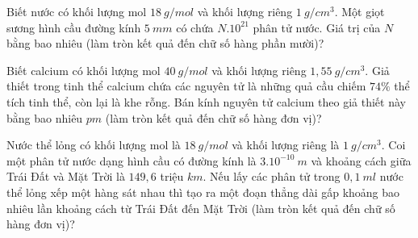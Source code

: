 \begin{ex}%
	Biết nước có khối lượng mol $18\ g/mol$ và khối lượng riêng $1\ g/cm^3$. Một giọt sương hình cầu đường kính $5\ mm$ có chứa $N.10^{21}$ phân tử nước. Giá trị của $N$ bằng bao nhiêu (làm tròn kết quả đến chữ số hàng phần mười)?
\end{ex}

\begin{ex}%
	Biết calcium có khối lượng mol $40\ g/mol$ và khối lượng riêng $1,55\ g/cm^3$. Giả thiết trong tinh thể calcium chứa các nguyên tử là những quả cầu chiếm $74\%$ thể tích tinh thể, còn lại là khe rỗng. Bán kính nguyên tử calcium theo giả thiết này bằng bao nhiêu $pm$ (làm tròn kết quả đến chữ số hàng đơn vị)?
	
\end{ex}

\begin{ex}%
	Nước thể lỏng có khối lượng mol là $18\ g/mol$ và khối lượng riêng là $1\ g/cm^3$. Coi một phân tử nước dạng hình cầu có đường kính là $3.10^{-10}\ m$ và khoảng cách giữa Trái Đất và Mặt Trời là $149,6$ triệu $km$. Nếu lấy các phân tử trong $0,1\ ml$ nước thể lỏng xếp một hàng sát nhau thì tạo ra một đoạn thẳng dài gấp khoảng bao nhiêu lần khoảng cách từ Trái Đất đến Mặt Trời (làm tròn kết quả đến chữ số hàng đơn vị)?
	
\end{ex}
